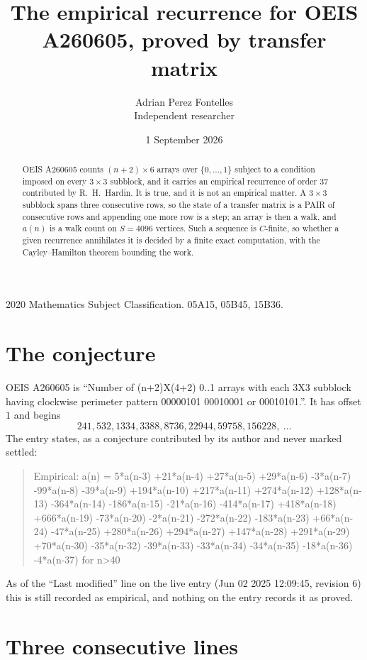 \documentclass[11pt,a4paper]{article}
\title{The empirical recurrence for OEIS A260605, proved by transfer matrix}
\author{Adrian Perez Fontelles\\ \small Independent researcher}
\date{1 September 2026}
\theoremstyle{plain}
\theoremstyle{definition}
\begin{document}
\maketitle

\begin{abstract}
OEIS A260605 counts $(n+2)\times6$ arrays over $\{0,\dots,1\}$ subject to a condition imposed on
every $3\times3$ subblock, and it carries an empirical recurrence of order $37$
contributed by R.~H.~Hardin. It is true, and it is not an empirical matter. A $3\times3$
subblock spans three consecutive rows, so the state of a transfer matrix is a PAIR of
consecutive rows and appending one more row is a step; an array is then a walk, and
$a(n)$ is a walk count on $S=4096$ vertices. Such a sequence is $C$-finite, so whether a given
recurrence annihilates it is decided by a finite exact computation, with the Cayley--Hamilton
theorem bounding the work.
\end{abstract}

\noindent\small 2020 Mathematics Subject Classification. 05A15, 05B45, 15B36.\normalsize

\section{The conjecture}

OEIS A260605 is ``Number of (n+2)X(4+2) 0..1 arrays with each 3X3 subblock having clockwise perimeter pattern 00000101 00010001 or 00010101.''. It has offset $1$ and begins
\[
241, 532, 1334, 3388, 8736, 22944, 59758, 156228,\ \dots
\]
The entry states, as a conjecture contributed by its author and never marked settled:
\begin{quote}
Empirical: a(n) = 5*a(n-3) +21*a(n-4) +27*a(n-5) +29*a(n-6) -3*a(n-7) -99*a(n-8) -39*a(n-9) +194*a(n-10) +217*a(n-11) +274*a(n-12) +128*a(n-13) -364*a(n-14) -186*a(n-15) -21*a(n-16) -414*a(n-17) +418*a(n-18) +666*a(n-19) -73*a(n-20) -2*a(n-21) -272*a(n-22) -183*a(n-23) +66*a(n-24) -47*a(n-25) +280*a(n-26) +294*a(n-27) +147*a(n-28) +291*a(n-29) +70*a(n-30) -35*a(n-32) -39*a(n-33) -33*a(n-34) -34*a(n-35) -18*a(n-36) -4*a(n-37) for n>40
\end{quote}
As of the ``Last modified'' line on the live entry (Jun 02 2025 12:09:45, revision 6) this is still
recorded as empirical, and nothing on the entry records it as proved.

\section{Three consecutive lines}
\end{document}
